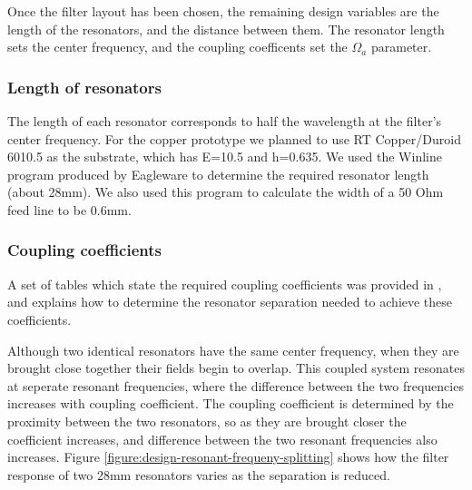 Once the filter layout has been chosen, the remaining design variables are the length of the resonators, and the distance between them. The resonator length sets the center frequency, and the coupling coefficents set the $\Omega_a$ parameter.


\subsubsection{Length of resonators}
The length of each resonator corresponds to half the wavelength at the filter's center frequency. For the copper prototype we planned to use RT Copper/Duroid 6010.5 as the substrate, which has E=10.5 and h=0.635. We used the Winline program produced by Eagleware to determine the required resonator length (about 28mm). We also used this program to calculate the width of a 50 Ohm feed line to be 0.6mm.


\subsubsection{Coupling coefficients}
A set of tables which state the required coupling coefficients was provided in \cite{hong:microstrip}, and \cite{hong:couplings} explains how to determine the resonator separation needed to achieve these coefficients.

Although two identical resonators have the same center frequency, when they are brought close together their fields begin to overlap. This coupled system resonates at seperate resonant frequencies, where the difference between the two frequencies increases with coupling coefficient. The coupling coefficient is determined by the proximity between the two resonators, so as they are brought closer the coefficient increases, and difference between the two resonant frequencies also increases. Figure \ref{figure:design-resonant-frequeny-splitting} shows how the filter response of two 28mm resonators varies as the separation is reduced.

